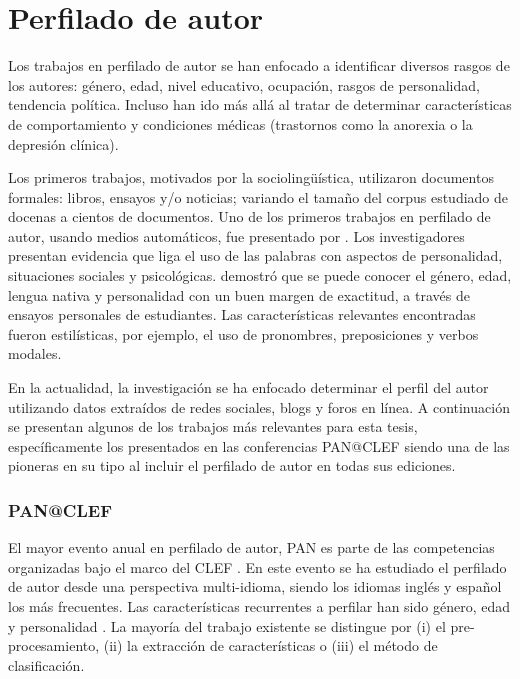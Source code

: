 \section{Perfilado de autor}
Los trabajos en perfilado de autor se han enfocado a identificar diversos rasgos de los autores: género, edad, nivel educativo, ocupación, rasgos de personalidad, tendencia política. Incluso han ido más allá al tratar de determinar características de comportamiento y condiciones médicas (trastornos como la anorexia o la depresión clínica). 

Los primeros trabajos, motivados por la sociolingüística, utilizaron documentos formales: libros, ensayos y/o noticias; variando el tamaño del corpus estudiado de docenas a cientos de documentos. 
Uno de los primeros trabajos en perfilado de autor, usando medios automáticos, fue presentado por \citep{Pennebaker2002}. Los investigadores presentan evidencia que liga el uso de las palabras con aspectos de personalidad, situaciones sociales y psicológicas. \citep{Argamon2009} demostró que se puede conocer el género, edad, lengua nativa y personalidad con un buen margen de exactitud, a través de ensayos personales de estudiantes. Las características relevantes encontradas fueron estilísticas, por ejemplo, el uso de pronombres, preposiciones y verbos modales. 

En la actualidad, la investigación se ha enfocado determinar el perfil del autor utilizando datos extraídos de redes sociales, blogs y foros en línea. A continuación se presentan algunos de los trabajos más relevantes para esta tesis, específicamente los presentados en las conferencias PAN@CLEF siendo una de las pioneras en su tipo al incluir el perfilado de autor en todas sus ediciones.

\subsubsection{PAN@CLEF}
El mayor evento anual en perfilado de autor, PAN es parte de las competencias organizadas bajo el marco del CLEF \citep{Rangel2013b, Rangel2019}. En este evento se ha estudiado el perfilado de autor desde una perspectiva multi-idioma, siendo los idiomas inglés y español los más frecuentes. Las características recurrentes a perfilar han sido género, edad y personalidad  \citep{Rangel2013b, Rangel2019, Rangel2016b, Stammatatos2015}.
La mayoría del trabajo existente se distingue por (i) el pre-procesamiento, (ii) la extracción de características o (iii) el método de clasificación.

